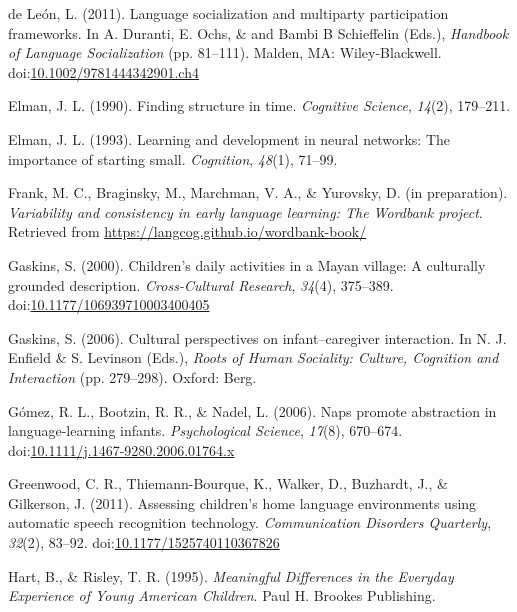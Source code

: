 \documentclass[,man,floatsintext]{apa6}
\begin{document}
\hypertarget{ref-deleon2011language}{}
de León, L. (2011). Language socialization and multiparty participation
frameworks. In A. Duranti, E. Ochs, \& and Bambi B Schieffelin (Eds.),
\emph{Handbook of Language Socialization} (pp. 81--111). Malden, MA:
Wiley-Blackwell.
doi:\href{https://doi.org/10.1002/9781444342901.ch4}{10.1002/9781444342901.ch4}

\hypertarget{ref-elman1990finding}{}
Elman, J. L. (1990). Finding structure in time. \emph{Cognitive
Science}, \emph{14}(2), 179--211.

\hypertarget{ref-elman1993learning}{}
Elman, J. L. (1993). Learning and development in neural networks: The
importance of starting small. \emph{Cognition}, \emph{48}(1), 71--99.

\hypertarget{ref-frankIPvariability}{}
Frank, M. C., Braginsky, M., Marchman, V. A., \& Yurovsky, D. (in
preparation). \emph{Variability and consistency in early language
learning: The Wordbank project}. Retrieved from
\url{https://langcog.github.io/wordbank-book/}

\hypertarget{ref-gaskins2000childrens}{}
Gaskins, S. (2000). Children's daily activities in a Mayan village: A
culturally grounded description. \emph{Cross-Cultural Research},
\emph{34}(4), 375--389.
doi:\href{https://doi.org/10.1177/106939710003400405}{10.1177/106939710003400405}

\hypertarget{ref-gaskins2006cultural}{}
Gaskins, S. (2006). Cultural perspectives on infant--caregiver
interaction. In N. J. Enfield \& S. Levinson (Eds.), \emph{Roots of
Human Sociality: Culture, Cognition and Interaction} (pp. 279--298).
Oxford: Berg.

\hypertarget{ref-gomez2006naps}{}
Gómez, R. L., Bootzin, R. R., \& Nadel, L. (2006). Naps promote
abstraction in language-learning infants. \emph{Psychological Science},
\emph{17}(8), 670--674.
doi:\href{https://doi.org/10.1111/j.1467-9280.2006.01764.x}{10.1111/j.1467-9280.2006.01764.x}

\hypertarget{ref-greenwood2011assessing}{}
Greenwood, C. R., Thiemann-Bourque, K., Walker, D., Buzhardt, J., \&
Gilkerson, J. (2011). Assessing children's home language environments
using automatic speech recognition technology. \emph{Communication
Disorders Quarterly}, \emph{32}(2), 83--92.
doi:\href{https://doi.org/10.1177/1525740110367826}{10.1177/1525740110367826}

\hypertarget{ref-hart1995meaningful}{}
Hart, B., \& Risley, T. R. (1995). \emph{Meaningful Differences in the
Everyday Experience of Young American Children}. Paul H. Brookes
Publishing.
\end{document}

